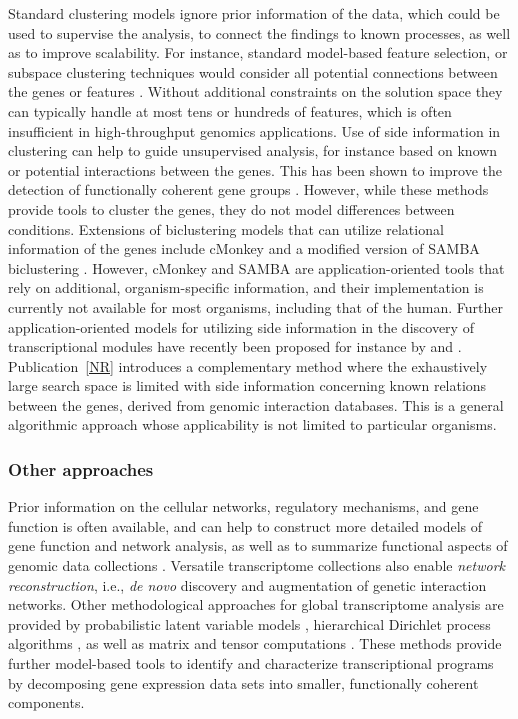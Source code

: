 Standard clustering models ignore prior information of the data, which
could be used to supervise the analysis, to connect the findings to
known processes, as well as to improve scalability. For instance,
standard model-based feature selection, or subspace clustering
techniques would consider all potential connections between the genes
or features \citep{Law04, Roth04}. Without additional constraints on
the solution space they can typically handle at most tens or hundreds
of features, which is often insufficient in high-throughput genomics
applications.  Use of side information in clustering can help to guide
unsupervised analysis, for instance based on known or potential
interactions between the genes. This has been shown to improve the
detection of functionally coherent gene groups \citep{Hanisch02,
Shiga07, Ulitsky07, Zhu05}. However, while these methods provide tools
to cluster the genes, they do not model differences between
conditions. Extensions of biclustering models that can utilize
relational information of the genes include cMonkey \citep{Reiss06}
and a modified version of SAMBA biclustering \citep{Tanay04}. However,
cMonkey and SAMBA are application-oriented tools that rely on
additional, organism-specific information, and their implementation is
currently not available for most organisms, including that of the
human.  Further application-oriented models for utilizing side
information in the discovery of transcriptional modules have recently
been proposed for instance by \cite{Savage2010} and \cite{Suthram10}.
Publication~\ref{NR} introduces a complementary method where the
exhaustively large search space is limited with side information
concerning known relations between the genes, derived from genomic
interaction databases. This is a general algorithmic approach whose
applicability is not limited to particular organisms.

\subsubsection{Other approaches}

Prior information on the cellular networks, regulatory mechanisms, and
gene function is often available, and can help to construct more
detailed models of gene function and network analysis, as well as to
summarize functional aspects of genomic data collections
\citep{Huttenhower09, Segal03nature, Troyanskaya05}. Versatile
transcriptome collections also enable {\it network reconstruction},
i.e., {\it de novo} discovery \citep{Lezon06, Myers05} and
augmentation \citep{Novak06} of genetic interaction networks. Other
methodological approaches for global transcriptome analysis are
provided by probabilistic latent variable models \citep{Rogers05,
  Segal03psb}, hierarchical Dirichlet process algorithms
\citep{Gerber07}, as well as matrix and tensor computations
\citep{Alter05}. These methods provide further model-based tools to
identify and characterize transcriptional programs by decomposing gene
expression data sets into smaller, functionally coherent components.


